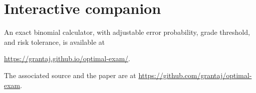 \documentclass[11pt,a4paper]{article}
\begin{document}
\section*{Interactive companion}
An exact binomial calculator, with adjustable error probability, grade threshold, and risk tolerance, is available at
\begin{center}
\url{https://grantaj.github.io/optimal-exam/}.
\end{center}
The associated source and the paper are at \url{https://github.com/grantaj/optimal-exam}.
\end{document}
